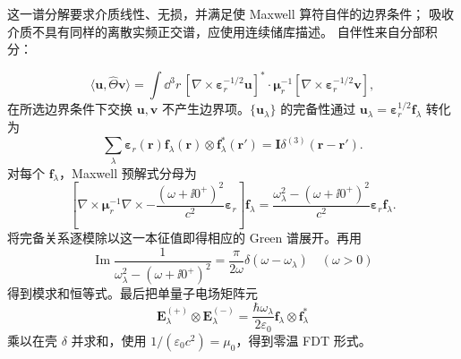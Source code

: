 









\begin{derivation}
这一谱分解要求介质线性、无损，并满足使 Maxwell 算符自伴的边界条件； 吸收介质不具有同样的离散实频正交谱，应使用连续储库描述。 自伴性来自分部积分：

\[
\langle\mathbf u,\hat\Theta\mathbf v\rangle
=\int\dd^3 r\,
[\nabla\times\boldsymbol\varepsilon_r^{-1/2}\mathbf u]^*\cdot
\boldsymbol\mu_r^{-1}
[\nabla\times\boldsymbol\varepsilon_r^{-1/2}\mathbf v],
\]
在所选边界条件下交换 $\mathbf u,\mathbf v$ 不产生边界项。$\{\mathbf u_\lambda\}$ 的完备性通过
$\mathbf u_\lambda=\boldsymbol\varepsilon_r^{1/2}\mathbf f_\lambda$
转化为
\[
\sum_\lambda
\boldsymbol\varepsilon_r(\mathbf r)\mathbf f_\lambda(\mathbf r)
\otimes\mathbf f_\lambda^*(\mathbf r')
=\mathbf I\delta^{(3)}(\mathbf r-\mathbf r').
\]
对每个 $\mathbf f_\lambda$，Maxwell 预解式分母为
\[
\left[\nabla\times\boldsymbol\mu_r^{-1}\nabla\times
-\frac{(\omega+\ii0^+)^2}{c^2}\boldsymbol\varepsilon_r\right]\mathbf f_\lambda
=\frac{\omega_\lambda^2-(\omega+\ii0^+)^2}{c^2}
\boldsymbol\varepsilon_r\mathbf f_\lambda.
\]
将完备关系逐模除以这一本征值即得相应的 Green 谱展开。再用
\[
\operatorname{Im}\frac1{\omega_\lambda^2-(\omega+\ii0^+)^2}
=\frac{\pi}{2\omega}\delta(\omega-\omega_\lambda)
\quad(\omega>0)
\]
得到模求和恒等式。最后把单量子电场矩阵元
\[
\mathbf E_\lambda^{(+)}\otimes\mathbf E_\lambda^{(-)}
=\frac{\hbar\omega_\lambda}{2\varepsilon_0}
\mathbf f_\lambda\otimes\mathbf f_\lambda^*
\]
乘以在壳 $\delta$ 并求和，使用 $1/(\varepsilon_0c^2)=\mu_0$，得到零温 FDT 形式。
\end{derivation}



